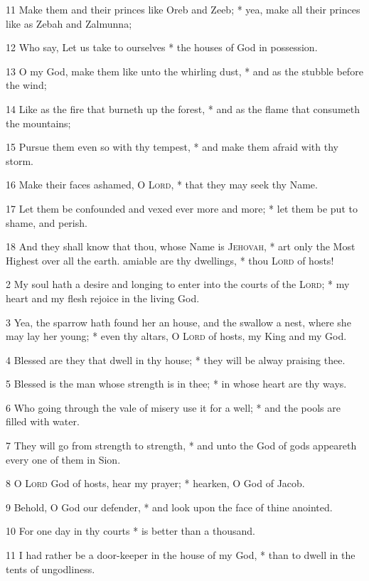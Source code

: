 11 Make them and their princes like Oreb and Zeeb; * yea, make all their princes like as Zebah and Zalmunna;\par
12 Who say, Let us take to ourselves * the houses of God in possession.\par
13 O my God, make them like unto the whirling dust, * and as the stubble before the wind;\par
14 Like as the fire that burneth up the forest, * and as the flame that consumeth the mountains;\par
15 Pursue them even so with thy tempest, * and make them afraid with thy storm.\par
16 Make their faces ashamed, O {\textsc{Lord}}, * that they may seek thy Name.\par
17 Let them be confounded and vexed ever more and more; * let them be put to shame, and perish.\par
18 And they shall know that thou, whose Name is \textsc{Jehovah}, * art only the Most Highest over all the earth.
 amiable are thy dwellings, * thou {\textsc{Lord}} of hosts!\par
2 My soul hath a desire and longing to enter into the courts of the {\textsc{Lord}}; * my heart and my flesh rejoice in the living God.\par
3 Yea, the sparrow hath found her an house, and the swallow a nest, where she may lay her young; * even thy altars, O {\textsc{Lord}} of hosts, my King and my God.\par
4 Blessed are they that dwell in thy house; * they will be alway praising thee.\par
5 Blessed is the man whose strength is in thee; * in whose heart are thy ways.\par
6 Who going through the vale of misery use it for a well; * and the pools are filled with water.\par
7 They will go from strength to strength, * and unto the God of gods appeareth every one of them in Sion.\par
8 O {\textsc{Lord}} God of hosts, hear my prayer; * hearken, O God of Jacob.\par
9 Behold, O God our defender, * and look upon the face of thine anointed.\par
10 For one day in thy courts * is better than a thousand.\par
11 I had rather be a door-keeper in the house of my God, * than to dwell in the tents of ungodliness.\par
